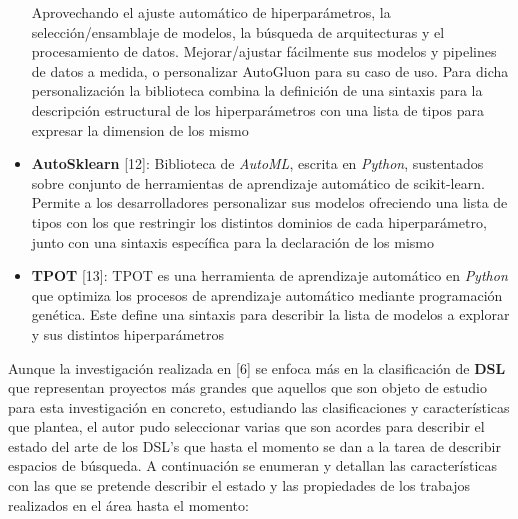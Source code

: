 \begin{itemize}
            Aprovechando el ajuste automático de hiperparámetros, la selección/ensamblaje de modelos,
            la búsqueda de arquitecturas y el procesamiento de datos. Mejorar/ajustar fácilmente sus
            modelos y pipelines de datos a medida, o personalizar AutoGluon para su caso de uso. Para
            dicha personalización la biblioteca combina la definición de una sintaxis para la descripción
            estructural de los hiperparámetros con una lista de tipos para expresar la dimension de los
            mismo
      \item {\bf AutoSklearn} [12]: Biblioteca de {\it AutoML}, escrita en {\it Python}, sustentados sobre
            conjunto de herramientas de aprendizaje automático de scikit-learn. Permite a los desarrolladores
            personalizar sus modelos ofreciendo una lista de tipos con los que restringir los distintos dominios
            de cada hiperparámetro, junto con una sintaxis específica para la declaración de los mismo
      \item {\bf TPOT} [13]: TPOT es una herramienta de aprendizaje automático en {\it Python} que optimiza los
            procesos de aprendizaje automático mediante programación genética. Este define una sintaxis para
            describir la lista de modelos a explorar y sus distintos hiperparámetros
\end{itemize}

Aunque la investigación realizada en [6] se enfoca más en la clasificación de {\bf DSL} que
representan proyectos más grandes que aquellos que son objeto de estudio para esta
investigación en concreto, estudiando las clasificaciones y características que plantea,
el autor pudo seleccionar varias que son acordes para describir el estado del arte
de los DSL's que hasta el momento se dan a la tarea de describir espacios de búsqueda.
A continuación se enumeran y detallan las características con las que se pretende
describir el estado y las propiedades de los trabajos realizados en el área hasta el
momento:

